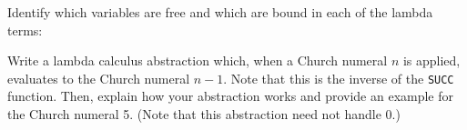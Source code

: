 \documentclass{exam}
\begin{document}
\begin{questions}
\begin{parts}
        \end{parts}

    \question[20]
        Identify which variables are free and which are bound in each of the
        lambda terms:


    \newpage
    \bonusquestion[10]
        Write a lambda calculus abstraction which, when a Church numeral $n$ is
        applied, evaluates to the Church numeral $n - 1$. Note that this is the
        inverse of the \texttt{SUCC} function. Then, explain how your
        abstraction works and provide an example for the Church numeral 5. (Note
        that this abstraction need not handle 0.)


\end{questions}
\end{document}
